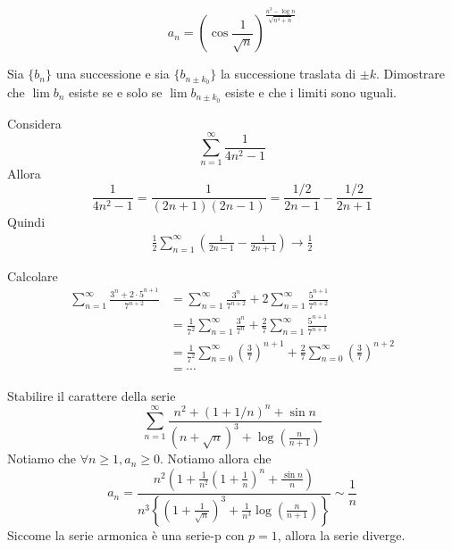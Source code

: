 \documentclass[a4paper]{article}
\begin{document}
\begin{snippetexercise}{}
    \[
        a_n = {\left(\cos \frac{1}{\sqrt{n}}\right)}^{\frac{n^3 - \log n}{\sqrt{n^4 + n}}}
    \]
\end{snippetexercise}


\begin{snippetexercise}{}
    Sia \(\{b_n\}\) una successione e sia \(\{b_{n\pm k_0}\}\) la successione traslata di
    \(\pm k\).
    Dimostrare che \(\lim b_n\) esiste se e solo se \(\lim b_{n \pm k_0}\) esiste e che i limiti sono uguali.
\end{snippetexercise}

\begin{snippetexample}{}
    Considera
    \[
        \sum_{n=1}^\infty \frac{1}{4n^2 - 1}
    \]
    Allora
    \[
        \frac{1}{4n^2 - 1} = \frac{1}{(2n+1)(2n-1)} = \frac{1/2}{2n-1} - \frac{1/2}{2n+1}
    \]
    Quindi
    \begin{align*}
        \frac{1}{2} \sum_{n=1}^\infty \left(\frac{1}{2n-1} - \frac{1}{2n+1}\right) \to
        \frac{1}{2}  
    \end{align*}
\end{snippetexample}

\begin{snippetexercise}{}
    Calcolare
    \begin{align*}
        \sum_{n=1}^\infty \frac{3^n + 2\cdot 5^{n+1}}{7^{n+2}}
        &= \sum_{n=1}^\infty \frac{3^{n}}{7^{n+2}}
        + 2 \sum_{n=1}^\infty \frac{5^{n+1}}{7^{n+2}} \\
        &= \frac{1}{7^2} \sum_{n=1}^\infty \frac{3^{n}}{7^n}
        + \frac{2}{7} \sum_{n=1}^\infty \frac{5^{n+1}}{7^{n+1}} \\
        &= \frac{1}{7^2} \sum_{n=0}^\infty {\left(\frac{3}{7}\right)}^{n+1}
        +  \frac{2}{7} \sum_{n=0}^\infty {\left(\frac{3}{7}\right)}^{n+2} \\
        &= \cdots
    \end{align*}
\end{snippetexercise}


\begin{snippetexercise}{}
    Stabilire il carattere della serie
    \[
        \sum_{n=1}^\infty \frac{n^2 + {(1 + 1/n)}^n + \sin n}{{(n+\sqrt{n})}^3 + \log \left(\frac{n}{n+1}\right)}
    \]
    Notiamo che \(\forall n \geq 1, a_n \geq 0\).
    Notiamo allora che
    \[
        a_n = \frac{n^2 \left(1 + \frac{1}{n^2}{\left(1 + \frac{1}{n}\right)}^n + \frac{\sin n}{n}\right)}
        {n^3 \left\{{\left(1 + \frac{1}{\sqrt{n}}\right)}^3 + \frac{1}{n^3}\log\left(\frac{n}{n+1}\right)\right\}}
        \sim \frac{1}{n}
    \]
    Siccome la serie armonica è una serie-p con \(p=1\), allora la serie diverge.
\end{snippetexercise}
\end{document}
